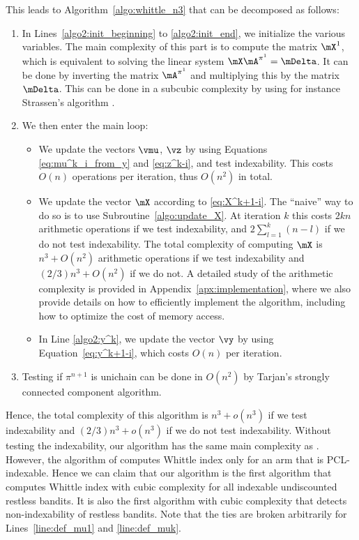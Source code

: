 This leads to Algorithm~\ref{algo:whittle_n3} that can be decomposed as follows:
\begin{enumerate}
    \item In Lines~\ref{algo2:init_beginning} to \ref{algo2:init_end}, we initialize the various variables. The main complexity of this part is to compute the matrix $\mX^1$, which is equivalent to solving the linear system $\mX\mA^{\pi^1}=\mDelta$. It can be done by inverting the matrix $\mA^{\pi^1}$ and multiplying this by the matrix $\mDelta$. This can be done in a subcubic complexity by using for instance Strassen's algorithm \cite{strassen1969gaussian}.
    \item We then enter the main loop:
        \begin{itemize}
            \item We update the vectors $\vmu$, $\vz$ by using Equations \eqref{eq:mu^k_i_from_y} and \eqref{eq:z^k-i}, and test indexability. This costs $O(n)$ operations per iteration, thus $O(n^2)$ in total.
            \item We update the vector $\mX$ according to \eqref{eq:X^k+1-i}. The ``naive'' way to do so is to use Subroutine~\ref{algo:update_X}. At iteration $k$ this costs $2kn$ arithmetic operations if we test indexability, and $2\sum_{l=1}^{k}(n-l)$ if we do not test indexability. The total complexity of computing $\mX$ is $n^3 +O(n^2)$ arithmetic operations if we test indexability and $(2/3)n^3 +O(n^2)$ if we do not.
              A detailed study of the arithmetic complexity is provided in Appendix~\ref{apx:implementation}, where we also provide details on how to efficiently implement the algorithm, including how to optimize the cost of memory access.
            \item In Line \ref{algo2:y^k}, we update the vector $\vy$ by using Equation~\eqref{eq:y^k+1-i}, which costs $O(n)$ per iteration. 
        \end{itemize}
    \item Testing if $\pi^{n+1}$ is unichain can be done in $O(n^2)$ by Tarjan's strongly connected component algorithm.
\end{enumerate}
Hence, the total complexity of this algorithm is $n^3+o(n^3)$ if we test indexability and $(2/3)n^3+o(n^3)$ if we do not test indexability. Without testing the indexability, our algorithm has the same main complexity as \cite{nino2020fast}. However, the algorithm of \cite{nino2020fast} computes Whittle index only for an arm that is PCL-indexable. Hence we can claim that our algorithm is the first algorithm that computes Whittle index with cubic complexity for all indexable undiscounted restless bandits. It is also the first algorithm with cubic complexity that detects non-indexability of restless bandits.
Note that the ties are broken arbitrarily for Lines~\ref{line:def_mu1} and \ref{line:def_muk}.


